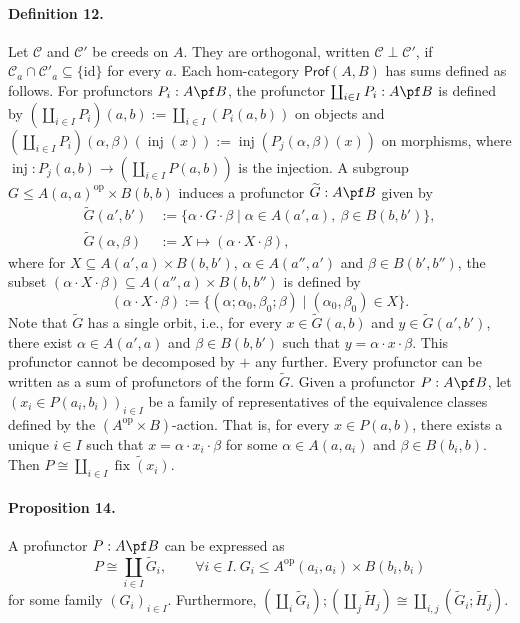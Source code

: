 \paragraph{Definition 12.} Let $\mathcal C$ and $\mathcal C'$ be creeds on $A$. They are orthogonal, written $\mathcal C\perp\mathcal C'$, if $\mathcal C_a\cap\mathcal C'_a\subseteq\{\mathrm{id}\}$ for every $a$.
Each hom-category $\mathsf{Prof}(A,B)$ has sums defined as follows. For profunctors $P_i:A\pf B$, the profunctor $\coprod_{i\in I}P_i:A\pf B$ is defined by $(\coprod_{i\in I}P_i)(a,b):=\coprod_{i\in I}(P_i(a,b))$ on objects and $(\coprod_{i\in I}P_i)(\alpha,\beta)(\operatorname{inj}(x)):=\operatorname{inj}(P_j(\alpha,\beta)(x))$ on morphisms, where $\operatorname{inj}:P_j(a,b)\to(\coprod_{i\in I}P(a,b))$ is the injection.
A subgroup $G\le A(a,a)^{\mathrm{op}}\times B(b,b)$ induces a profunctor $\widetilde G:A\pf B$ given by
\[
\begin{aligned}
\widetilde G(a',b')&:=\{\alpha\cdot G\cdot\beta\mid\alpha\in A(a',a),\ \beta\in B(b,b')\},\\
\widetilde G(\alpha,\beta)&:=X\mapsto(\alpha\cdot X\cdot\beta),
\end{aligned}
\]
where for $X\subseteq A(a',a)\times B(b,b')$, $\alpha\in A(a'',a')$ and $\beta\in B(b',b'')$, the subset $(\alpha\cdot X\cdot\beta)\subseteq A(a'',a)\times B(b,b'')$ is defined by
\[
(\alpha\cdot X\cdot\beta):=\{(\alpha;\alpha_0,\beta_0;\beta)\mid(\alpha_0,\beta_0)\in X\}.
\]
Note that $\widetilde G$ has a single orbit, i.e., for every $x\in\widetilde G(a,b)$ and $y\in\widetilde G(a',b')$, there exist $\alpha\in A(a',a)$ and $\beta\in B(b,b')$ such that $y=\alpha\cdot x\cdot\beta$. This profunctor cannot be decomposed by $+$ any further.
Every profunctor can be written as a sum of profunctors of the form $\widetilde G$. Given a profunctor $P:A\pf B$, let $(x_i\in P(a_i,b_i))_{i\in I}$ be a family of representatives of the equivalence classes defined by the $(A^{\mathrm{op}}\times B)$-action. That is, for every $x\in P(a,b)$, there exists a unique $i\in I$ such that $x=\alpha\cdot x_i\cdot\beta$ for some $\alpha\in A(a,a_i)$ and $\beta\in B(b_i,b)$. Then $P\cong\coprod_{i\in I}\widetilde{\operatorname{fix}(x_i)}$.
\paragraph{Proposition 14.} A profunctor $P:A\pf B$ can be expressed as
\[
P\cong\coprod_{i\in I}\widetilde G_i,\qquad
\forall i\in I.\ G_i\le A^{\mathrm{op}}(a_i,a_i)\times B(b_i,b_i)
\]
for some family $(G_i)_{i\in I}$. Furthermore,
$(\coprod_i\widetilde G_i);(\coprod_j\widetilde H_j)\cong\coprod_{i,j}(\widetilde G_i;\widetilde H_j)$.
